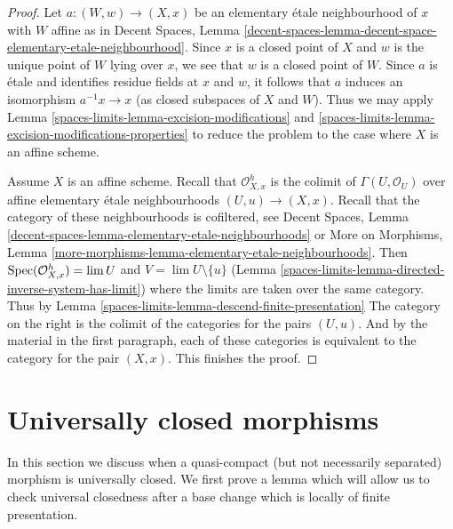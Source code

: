 \begin{proof}
Let $a : (W, w) \to (X, x)$ be an elementary \'etale neighbourhood of $x$
with $W$ affine as in
Decent Spaces, Lemma
\ref{decent-spaces-lemma-decent-space-elementary-etale-neighbourhood}.
Since $x$ is a closed point of $X$ and $w$ is the unique point of $W$
lying over $x$, we see that $w$ is a closed point of $W$. Since $a$
is \'etale and identifies residue fields at $x$ and $w$, it
follows that $a$ induces an isomorphism $a^{-1}x \to x$ (as closed
subspaces of $X$ and $W$). Thus we may apply
Lemma \ref{spaces-limits-lemma-excision-modifications} and
\ref{spaces-limits-lemma-excision-modifications-properties}
to reduce the problem to the case where $X$ is an affine scheme.

\medskip\noindent
Assume $X$ is an affine scheme. Recall that $\mathcal{O}_{X, x}^h$
is the colimit of $\Gamma(U, \mathcal{O}_U)$ over affine
elementary \'etale neighbourhoods $(U, u) \to (X, x)$.
Recall that the category of these neighbourhoods is
cofiltered, see Decent Spaces, Lemma
\ref{decent-spaces-lemma-elementary-etale-neighbourhoods} or
More on Morphisms, Lemma
\ref{more-morphisms-lemma-elementary-etale-neighbourhoods}.
Then $\operatorname{Spec}(\mathcal{O}_{X, x}^h) = \lim U$ and
$V = \lim U \setminus \{u\}$
(Lemma \ref{spaces-limits-lemma-directed-inverse-system-has-limit})
where the limits are taken over the same category. Thus by
Lemma \ref{spaces-limits-lemma-descend-finite-presentation}
The category on the right is the colimit of the categories
for the pairs $(U, u)$. And by the material in the first
paragraph, each of these categories is equivalent to the
category for the pair $(X, x)$. This finishes the proof.
\end{proof}

\section{Universally closed morphisms}
\label{spaces-limits-section-universally-closed}
In this section we discuss when a quasi-compact (but not necessarily
separated) morphism is universally closed. We first prove a lemma which
will allow us to check universal closedness after a base change
which is locally of finite presentation.

